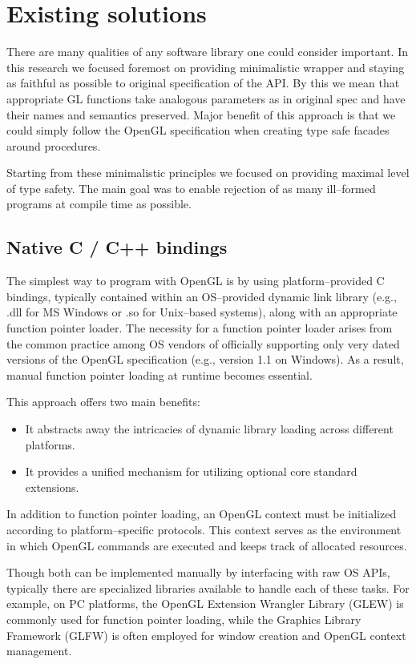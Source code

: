 \chapter{Existing solutions}

There are many qualities of any software library one could consider important.
In this research we focused foremost on providing minimalistic wrapper and staying as faithful as possible to original specification of the API.
By this we mean that appropriate GL functions take analogous parameters as in original spec and have their names and semantics preserved.
Major benefit of this approach is that we could simply follow the OpenGL specification when creating type safe facades around procedures.

Starting from these minimalistic principles we focused on providing maximal level of type safety. The main goal was to enable rejection of as many ill--formed programs at compile time as possible.

\section{Native C / C++ bindings}

The simplest way to program with OpenGL is by using platform--provided C bindings, 
typically contained within an OS--provided dynamic link library (e.g., .dll for MS Windows or .so for Unix--based systems), 
along with an appropriate function pointer loader.
The necessity for a function pointer loader arises from the common practice among OS vendors of officially supporting only very dated versions of the OpenGL specification 
(e.g., version 1.1 on Windows). As a result, manual function pointer loading at runtime becomes essential. 

This approach offers two main benefits:
\begin{itemize}
    \item It abstracts away the intricacies of dynamic library loading across different platforms.
    \item It provides a unified mechanism for utilizing optional core standard extensions.
\end{itemize}

In addition to function pointer loading, an OpenGL context must be initialized according to platform--specific protocols. 
This context serves as the environment in which OpenGL commands are executed and keeps track of allocated resources.

Though both can be implemented manually by interfacing with raw OS APIs, typically there are specialized libraries available to handle each of these tasks.
For example, on PC platforms, the OpenGL Extension Wrangler Library (GLEW) \cite{glewwebsite} is commonly used for function pointer loading, 
while the Graphics Library Framework (GLFW) \cite{glfwwebsite} is often employed for window creation and OpenGL context management.

